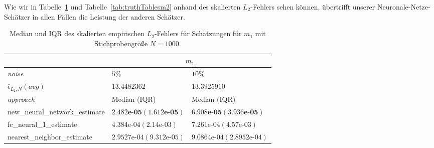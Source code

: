 {%

\begin{figure}
\centering
%
\end{figure}

Wie wir in Tabelle~\ref{tab:truthTablesm1} und Tabelle~\ref{tab:truthTablesm2} anhand des skalierten $L_2$-Fehlers sehen können, übertrifft unserer Neuronale-Netze-Schätzer in allen Fällen die Leistung der anderen Schätzer. 

\begin{table}
\centering
\begin{tabular}{ |p{5cm}||p{4cm}|p{4cm}|}
 \hline
 & \multicolumn{2}{|c|}{$m_1$}\\
 \hline
 \textit{noise}& $5\%$ & $10\%$ \\
 \hline
 $\bar{\epsilon}_{L_2,N}(avg)$& $13.4482362$ & $13.3925910$ \\
 \hline
 \textit{approach}&  Median (IQR) &  Median (IQR)   \\
 \hline
 new\_neural\_network\_estimate & $\mathbf{2.482\textbf{e-}05 (1.612\textbf{e-}05)}$   & $\mathbf{6.908\textbf{e-}05 (3.936\textbf{e-}05)}$  \\
 fc\_neural\_1\_estimate & $4.384\text{e-}04 (2.14\text{e-}03)$ &   $7.261\text{e-}04 (4.57\text{e-}03)$ \\
 nearest\_neighbor\_estimate & $2.9527\text{e-}04 (9.312\text{e-}05)$ & $9.0864\text{e-}04 (2.8952\text{e-}04)$\\
 \hline
\end{tabular}
    \caption{Median und IQR des skalierten empirischen $L_2$-Fehlers für Schätzungen für $m_1$ mit Stichprobengröße $N = 1000$.}
     \label{tab:truthTablesm1}   
\end{table}
    
}
